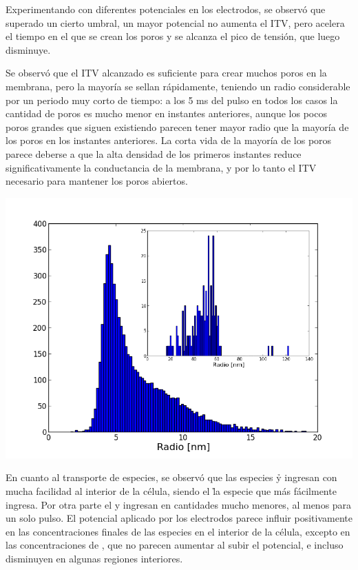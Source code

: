 \documentclass[11pt, twocolumn]{article}
\begin{document}
Experimentando con diferentes potenciales en los electrodos, se observó que superado un cierto umbral, un mayor potencial no aumenta el ITV, pero acelera el tiempo en el que se crean los poros y se alcanza el pico de tensión, que luego disminuye.

Se observó que el ITV alcanzado es suficiente para crear muchos poros en la membrana, pero la mayoría se sellan rápidamente, teniendo un radio considerable por un periodo muy corto de tiempo: a los 5 ms del pulso en todos los casos la cantidad de poros es mucho menor en instantes anteriores, aunque los pocos poros grandes que siguen existiendo parecen tener mayor radio que la mayoría de los poros en los instantes anteriores. La corta vida de la mayoría de los poros parece deberse a que la alta densidad de los primeros instantes reduce significativamente la conductancia de la membrana, y por lo tanto el ITV necesario para mantener los poros abiertos.

\begin{center}
	\includegraphics[width=1\linewidth]{hist-pip}
\end{center}


En cuanto al transporte de especies, se observó que las especies \h y \oh ingresan con mucha facilidad al interior de la célula, siendo el \h la especie que más fácilmente ingresa. Por otra parte el \na y \cl ingresan en cantidades mucho menores, al menos para un solo pulso. El potencial aplicado por los electrodos parece influir positivamente en las concentraciones finales de las especies en el interior de la célula, excepto en las concentraciones de \cl, que no parecen aumentar al subir el potencial, e incluso disminuyen en algunas regiones interiores.
\end{document}
